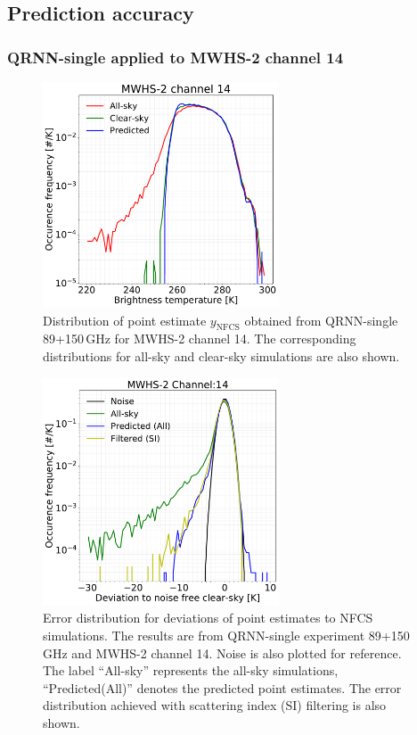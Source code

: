 \documentclass[amt, manuscript]{copernicus}
\newcommand{\ynfcs}{y_\text{NFCS}}
\begin{document}
\subsection{Prediction accuracy}

\subsubsection{QRNN-single applied to MWHS-2 channel 14} 
\begin{figure}[t]
	\centering
	\includegraphics[width = 70mm]{Figures/QRNN_output_mwhs.pdf} 
	\caption{Distribution of point estimate $\ynfcs$ obtained from QRNN-single 89+150\,GHz for MWHS-2 channel 14. The corresponding distributions for all-sky and clear-sky simulations are also shown.}
	\label{fig:distribution_predicted_mwhs14}	
\end{figure}
\begin{figure}[t]
	\centering
	\includegraphics[width = 70mm]{Figures/MWHS_error_dist_14.pdf} 
	\caption{Error distribution for deviations of point estimates to NFCS simulations. The results are from QRNN-single experiment 89+150\,GHz and MWHS-2 channel 14. Noise is also plotted for reference. The label ``All-sky'' represents the all-sky simulations, ``Predicted(All)'' denotes the predicted point estimates. The error distribution achieved with scattering index (SI) filtering is also shown. }
	\label{fig:error_distribution_mwhs14}	
\end{figure}
\end{document}
